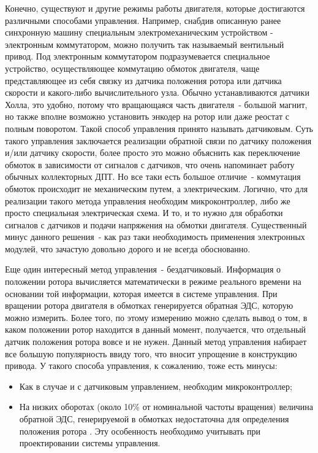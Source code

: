 Конечно, существуют и другие режимы работы двигателя, которые достигаются 
различными способами управления. Например, снабдив описанную ранее синхронную
машину специальным электромеханическим устройством - электронным коммутатором, 
можно получить так называемый вентильный привод. Под электронным коммутатором
подразумевается специальное устройство, осуществляющее коммутацию обмоток двигателя, 
чаще представляющее из себя связку
из датчика положения ротора или датчика скорости и какого-либо вычислительного узла. Обычно устанавливаются 
датчики Холла, это удобно, потому что вращающаяся часть двигателя~- большой магнит, но также
вполне возможно установить энкодер на ротор или даже реостат с полным поворотом. 
Такой способ управления принято называть датчиковым. Суть такого управления 
заключается реализации обратной связи по датчику положения и/или датчику скорости, более просто 
это можно объяснить как переключение обмоток в зависимости от сигналов с датчиков, что очень напоминает работу 
обычных коллекторных ДПТ. Но все таки есть
большое отличие~- коммутация обмоток происходит не механическим путем, а электрическим.
Логично, что для реализации такого метода управления необходим микроконтроллер, либо же просто
специальная электрическая схема. И то, и то нужно для
обработки сигналов с датчиков и подачи напряжения на обмотки двигателя.
Существенный минус данного решения~- как раз таки необходимость
применения электронных модулей, что зачастую довольно дорого и не всегда обоснованно. 

Еще один интересный метод управления~- бездатчиковый. Информация о положении ротора 
вычисляется математически в режиме реального времени на основании той 
информации, которая имеется в системе управления. При вращении ротора двигателя в 
обмотках генерируется обратная ЭДС, которую можно измерить. 
Более того, по этому измерению можно сделать вывод о том, в каком положении ротор 
находится в данный момент, получается, что отдельный датчик положения ротора вовсе и не нужен.
Данный метод управления набирает все большую популярность ввиду того, что вносит
упрощение в конструкцию привода.
У такого способа управления, к сожалению, тоже есть минусы:
\begin{itemize}
  \item Как в случае и с датчиковым управлением, необходим микроконтроллер;
  \item На низких оборотах (около 10\% от номинальной частоты вращения) величина обратной ЭДС,
генерируемой в обмотках недостаточна для определения положения ротора \cite{Инжреш}. Эту особенность
необходимо учитывать при проектировании системы управления.
\end{itemize}

